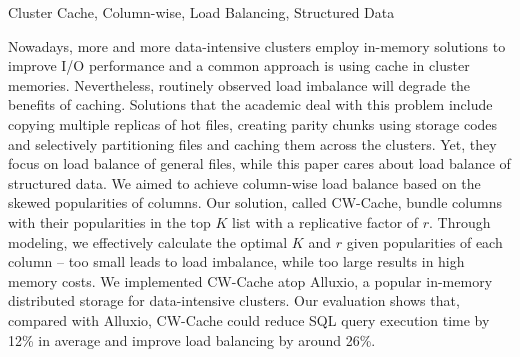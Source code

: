 
\begin{abstract}{集群缓存，列级别，负载均衡，结构化数据}

    目前越来越多的数据密集型集群部署内存计算方案来提高I/O性能，在集群内存使用缓存是一种普遍做法。然而负载不均这一集群缓存中常见的问题则会损害缓存带来的好处。学术界应对这一问题的方法包括将热门的文件复制多份、用存储编码为文件创建同等分区、选择性地将文件分割成多份来分散存储。然而这些方法均关注一般意义上的文件的负载均衡，而本文关注的是结构化数据的负载均衡，根据数据表中各个列的访问热度倾斜实现列级别的负载均衡。我们的解决方案称为CW-Cache，将数据表中访问热度排在前$K$的列一起复制$r$份缓存在集群中。我们通过数学建模，在数据表各个列的热度确定的情况下，高效地计算出最优的$K$和$r$——二者太小不足以实现负载均衡，太大则会增大内存开销。我们在分布式内存文件系统Alluxio上实现了CW-Cache，评估表明相比原生Alluxio，我们的CW-Cache系统能够降低SQL任务执行时间达平均12\%，负载不均衡程度优化26\%。
    \end{abstract}
    
    \begin{englishabstract}{Cluster Cache, Column-wise, Load Balancing,  Structured Data}
    
    Nowadays, more and more data-intensive clusters employ in-memory solutions to improve I/O performance and a common approach is using cache in cluster memories. Nevertheless, routinely observed load imbalance will degrade the benefits of caching. Solutions that the academic deal with this problem include copying multiple replicas of hot files, creating parity chunks using storage codes and selectively partitioning files and caching them across  the clusters. Yet, they focus on load balance of general files, while this paper cares about load balance of structured data. We aimed to achieve column-wise load balance based on the skewed popularities of columns. Our solution, called CW-Cache, bundle columns with their popularities in the top $K$ list with a replicative factor of $r$. Through modeling, we effectively calculate the optimal $K$ and $r$ given popularities of each column -- too small leads to load imbalance, while too large results in high memory costs. We implemented CW-Cache atop Alluxio, a popular in-memory distributed storage for data-intensive clusters. Our evaluation shows that, compared with Alluxio, CW-Cache could reduce SQL query execution time by 12\% in average and improve load balancing by around 26\%.
    \end{englishabstract}

